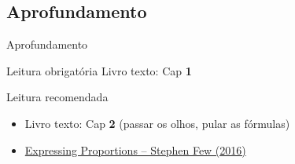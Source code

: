 \documentclass{beamer}
\begin{document}





\subsection{Aprofundamento}

\begin{frame}{\scriptsize Aprofundamento}
  \begin{block}{Leitura obrigatória}
    \footnotesize
    Livro texto: Cap {\bf 1}
  \end{block}
  \begin{block}{Leitura recomendada}
    \begin{itemize}
      \scriptsize
    \item Livro texto: Cap {\bf 2} ({\scriptsize passar os olhos, pular as fórmulas})
      \smallskip
    \item \href{http://www.perceptualedge.com/articles/visual_business_intelligence/expressing_proportions.pdf}{Expressing Proportions -- Stephen Few (2016)}
    \end{itemize}
  \end{block}
\end{frame}
\end{document}
